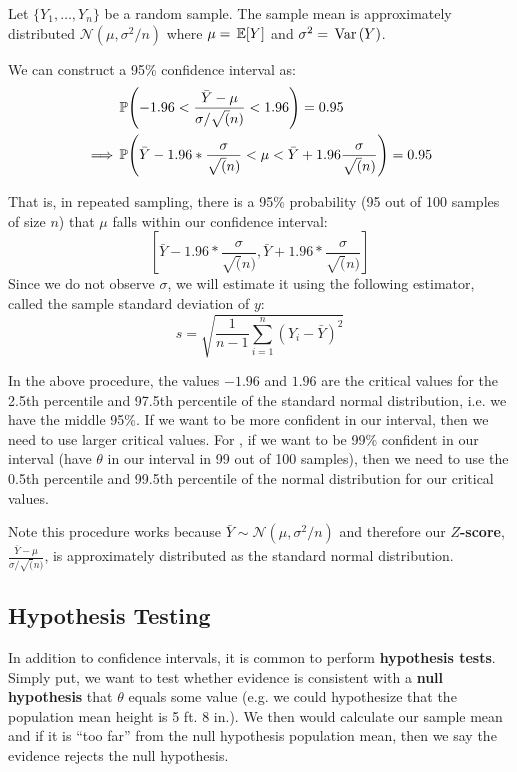 \documentclass[12pt]{article}
\begin{document}
\begin{example}
  Let $\{ Y_1, \dots, Y_n \}$ be a random sample. The sample mean is approximately distributed $\mathcal{N}(\mu, \sigma^2 / n)$ where $\mu = \expec{Y}$ and $\sigma^2 = \var{Y}$. 

  We can construct a 95\% confidence interval as: 
  \begin{align*}
    &\P{-1.96 < \frac{\bar{Y} - \mu}{\sigma / \sqrt(n)} < 1.96} = 0.95 \\
    \implies &\P{\bar{Y} - 1.96 * \frac{\sigma}{\sqrt(n)} < \mu  < \bar{Y} + 1.96 \frac{\sigma}{\sqrt(n)}} = 0.95
  \end{align*}

  That is, in repeated sampling, there is a 95\% probability (95 out of 100 samples of size $n$) that $\mu$ falls within our confidence interval: 
  $$
    \left[
      \bar{Y} - 1.96 * \frac{\sigma}{\sqrt(n)}, 
      \bar{Y} + 1.96 * \frac{\sigma}{\sqrt(n)}
    \right]
  $$
  Since we do not observe $\sigma$, we will estimate it using the following estimator, called the sample standard deviation of $y$:
  $$
    s = \sqrt{\frac{1}{n-1} \sum_{i=1}^n (Y_i - \bar{Y})^2}
  $$
\end{example}

In the above procedure, the values $-1.96$ and $1.96$ are the critical values for the 2.5th percentile and 97.5th percentile of the standard normal distribution, i.e. we have the middle 95\%. If we want to be more confident in our interval, then we need to use larger critical values. For , if we want to be 99\% confident in our interval (have $\theta$ in our interval in 99 out of 100 samples), then we need to use the 0.5th percentile and 99.5th percentile of the normal distribution for our critical values.

Note this procedure works because $\bar{Y} \sim \mathcal{N}(\mu, \sigma^2/n)$ and therefore our \textbf{$Z$-score}, $\frac{\bar{Y} - \mu}{\sigma / \sqrt(n)}$, is approximately distributed as the standard normal distribution.


\subsection*{Hypothesis Testing}

In addition to confidence intervals, it is common to perform \textbf{hypothesis tests}. Simply put, we want to test whether evidence is consistent with a \textbf{null hypothesis} that $\theta$ equals some value (e.g. we could hypothesize that the population mean height is 5 ft. 8 in.). We then would calculate our sample mean and if it is ``too far'' from the null hypothesis population mean, then we say the evidence rejects the null hypothesis. 
\end{document}
